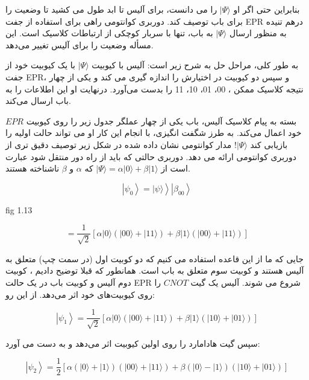 \documentclass{book}
\begin{document}
بنابراین حتی اگر او $\vert \Psi \rangle$ را می دانست، برای آلیس تا ابد طول می کشید تا وضعیت را برای باب توصیف کند. دوربری کوانتومی راهی برای استفاده از جفت EPR درهم تنیده به منظور ارسال $\vert \Psi \rangle$ به باب، تنها با سربار کوچکی از ارتباطات کلاسیک است. این مسأله وضعیت را برای آلیس تغییر می‌دهد.

به طور کلی، مراحل حل به شرح زیر است: آلیس با کیوبیت $\vert \Psi \rangle$ با یک کیوبیت خود از جفت EPR، و سپس دو کیوبیت در اختیارش را اندازه گیری می کند و یکی از چهار نتیجه کلاسیک ممکن
، 00، 01، 10، 11 را بدست می‌آورد. درنهایت او این اطلاعات را به باب ارسال می‌کند.


 بسته به پیام کلاسیک آلیس، باب یکی از چهار عملگر جدول زیر را روی کیوبیت $EPR$ خود اعمال می‌کند.
 به طرز شگفت انگیزی، با انجام این کار او می تواند حالت اولیه را بازیابی کند $\vert \Psi \rangle$! مدار کوانتومی نشان داده شده در شکل زیر توصیف دقیق تری از دوربری کوانتومی ارائه می دهد.
دوربری حالتی که باید از راه دور منتقل شود عبارت است از $\vert \Psi \rangle = \alpha \vert 0 \rangle + \beta \vert 1 \rangle$ که $\alpha$ و $\beta$ ناشناخته هستند.

\begin{center}
	$$\left.\left|\psi_0\right\rangle=|\psi\rangle\right\rangle\left|\beta_{00}\right\rangle$$
\end{center}



fig 1.13




\begin{center}
	$$=\frac{1}{\sqrt{2}}[\alpha|0\rangle(|00\rangle+|11\rangle)+\beta|1\rangle(|00\rangle+|11\rangle)]$$
\end{center}

جایی که ما از این قاعده استفاده می کنیم که دو کوبیت اول (در سمت چپ) متعلق به آلیس هستند و
کوبیت سوم متعلق به باب است. همانطور که قبلا توضیح دادیم ، کوبیت دوم آلیس و کوبیت باب
در یک حالت EPR شروع می شوند. آلیس یک گیت $CNOT$ را روی کیوبیت‌های خود اثر می‌دهد. از این رو:


\begin{center}
	$$\left|\psi_1\right\rangle=\frac{1}{\sqrt{2}}[\alpha|0\rangle(|00\rangle+|11\rangle)+\beta|1\rangle(|10\rangle+|01\rangle)]$$
\end{center}

سپس گیت هادامارد را روی اولین کیوبیت اثر می‌دهد و به دست می آورد:

\begin{center}
	$$\left|\psi_2\right\rangle=\frac{1}{2}[\alpha(|0\rangle+|1\rangle)(|00\rangle+|11\rangle)+\beta(|0\rangle-|1\rangle)(|10\rangle+|01\rangle)]$$
\end{center}
\end{document}
